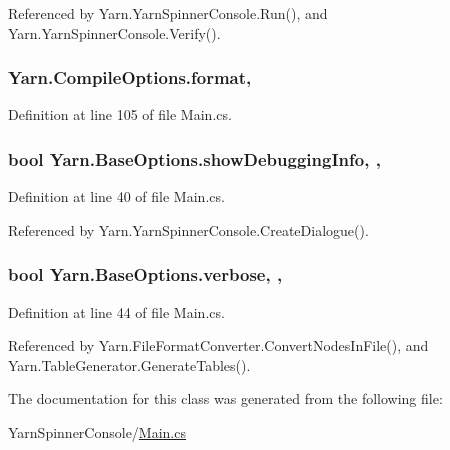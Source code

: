 Referenced by Yarn.\-Yarn\-Spinner\-Console.\-Run(), and Yarn.\-Yarn\-Spinner\-Console.\-Verify().

\hypertarget{a00045_a9904ccfb1b0ff64df415c4fc9fe6eb1c}{
\subsubsection[{format}]{ Yarn.\-Compile\-Options.\-format\hspace{0.3cm}{\ttfamily [get]}, {\ttfamily [set]}}}\label{a00045_a9904ccfb1b0ff64df415c4fc9fe6eb1c}


Definition at line 105 of file Main.\-cs.

\hypertarget{a00031_a89964ea17bd19caf00cb5bff563ed01c}{
\subsubsection[{show\-Debugging\-Info}]{\setlength{\rightskip}{0pt plus 5cm}bool Yarn.\-Base\-Options.\-show\-Debugging\-Info\hspace{0.3cm}{\ttfamily [get]}, {\ttfamily [set]}, {\ttfamily [inherited]}}}\label{a00031_a89964ea17bd19caf00cb5bff563ed01c}


Definition at line 40 of file Main.\-cs.



Referenced by Yarn.\-Yarn\-Spinner\-Console.\-Create\-Dialogue().

\hypertarget{a00031_ada4d83d1756918f362d55f6649b82b17}{
\subsubsection[{verbose}]{\setlength{\rightskip}{0pt plus 5cm}bool Yarn.\-Base\-Options.\-verbose\hspace{0.3cm}{\ttfamily [get]}, {\ttfamily [set]}, {\ttfamily [inherited]}}}\label{a00031_ada4d83d1756918f362d55f6649b82b17}


Definition at line 44 of file Main.\-cs.



Referenced by Yarn.\-File\-Format\-Converter.\-Convert\-Nodes\-In\-File(), and Yarn.\-Table\-Generator.\-Generate\-Tables().



The documentation for this class was generated from the following file\-:\begin{DoxyCompactItemize}
\item 
Yarn\-Spinner\-Console/\hyperlink{a00307}{Main.\-cs}\end{DoxyCompactItemize}

